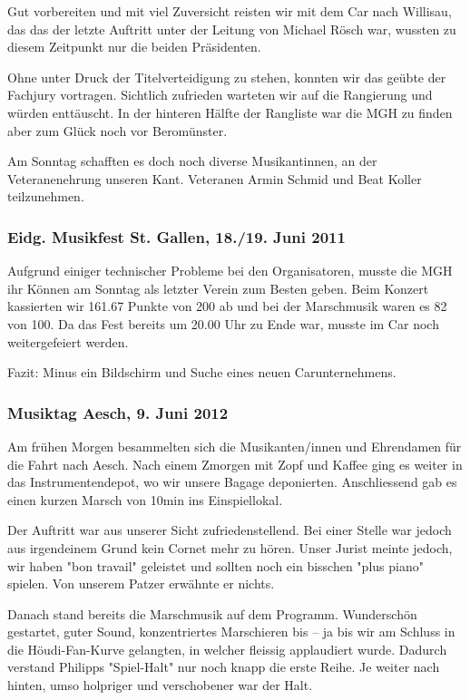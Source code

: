 \begin{history}
    Gut vorbereiten und mit viel Zuversicht reisten wir mit dem Car nach
    Willisau, das das der letzte Auftritt unter der Leitung von Michael Rösch
    war, wussten zu diesem Zeitpunkt nur die beiden Präsidenten.

    Ohne unter Druck der Titelverteidigung zu stehen, konnten wir das geübte der
    Fachjury vortragen. Sichtlich zufrieden warteten wir auf die Rangierung und
    würden enttäuscht. In der hinteren Hälfte der Rangliste war die MGH zu
    finden aber zum Glück noch vor Beromünster.

    Am Sonntag schafften es doch noch diverse Musikantinnen, an der
    Veteranenehrung unseren Kant. Veteranen Armin Schmid und Beat Koller
    teilzunehmen.


    \subsubsection*{Eidg. Musikfest St. Gallen, 18./19. Juni 2011}

    Aufgrund einiger technischer Probleme bei den Organisatoren, musste die MGH
    ihr Können am Sonntag als letzter Verein zum Besten geben. Beim Konzert
    kassierten wir 161.67 Punkte von 200 ab und bei der Marschmusik waren es 82
    von 100. Da das Fest bereits um 20.00 Uhr zu Ende war, musste im Car noch
    weitergefeiert werden.

    Fazit: Minus ein Bildschirm und Suche eines neuen Carunternehmens.


    \subsubsection*{Musiktag Aesch, 9. Juni 2012}

    Am frühen Morgen besammelten sich die Musikanten/innen und Ehrendamen für
    die Fahrt nach Aesch. Nach einem Zmorgen mit Zopf und Kaffee ging es weiter
    in das Instrumentendepot, wo wir unsere Bagage deponierten. Anschliessend
    gab es einen kurzen Marsch von 10min ins Einspiellokal.

    Der Auftritt war aus unserer Sicht zufriedenstellend. Bei einer Stelle war
    jedoch aus irgendeinem Grund kein Cornet mehr zu hören. Unser Jurist meinte
    jedoch, wir haben "bon travail" geleistet und sollten noch ein bisschen
    "plus piano" spielen. Von unserem Patzer erwähnte er nichts.

    Danach stand bereits die Marschmusik auf dem Programm. Wunderschön
    gestartet, guter Sound, konzentriertes Marschieren bis -- ja bis wir am
    Schluss in die Höudi-Fan-Kurve gelangten, in welcher fleissig applaudiert
    wurde. Dadurch verstand Philipps "Spiel-Halt" nur noch knapp die erste
    Reihe. Je weiter nach hinten, umso holpriger und verschobener war der Halt.


\end{history}
